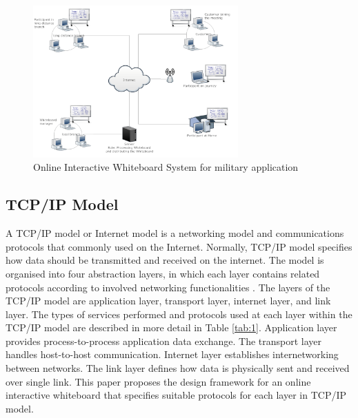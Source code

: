 \documentclass[conference]{IEEEtran}
\begin{document}
\begin{figure}[t]
\begin{center}
\includegraphics[width=0.7\textwidth]{iw_system_overview.png}
\caption{Online Interactive Whiteboard System for military application}
\label{fig:1}
\end{center}
\end{figure}

\subsection{TCP/IP Model}

A TCP/IP model or Internet model is a networking model and communications protocols that commonly used on the Internet. 
Normally, TCP/IP model specifies how data should be transmitted and received on the internet. The model is organised into four abstraction layers, in which each layer contains related protocols according to involved networking functionalities \cite{RFC1122, RFC1123}.
The layers of the TCP/IP model are application layer, transport layer, internet layer, and link layer. 
The types of services performed and protocols used at each layer within the TCP/IP model are described in more detail in Table \ref{tab:1}. 
Application layer provides process-to-process application data exchange. 
The transport layer handles host-to-host communication. Internet layer establishes internetworking between networks. 
The link layer defines how data is physically sent and received over single link. 
This paper proposes the design framework for an online interactive whiteboard that specifies suitable protocols for each layer in TCP/IP model.
\end{document}
